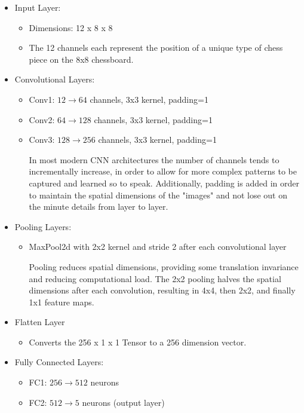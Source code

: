 \begin{itemize}
    \item Input Layer:
    \begin{itemize}
        \item Dimensions: 12 x 8 x 8
        \item The 12 channels each represent the position of a unique type of chess piece on the 8x8 chessboard.
    \end{itemize}
    \item Convolutional Layers:
    \begin{itemize}
        \item Conv1: $12 \rightarrow 64$ channels, 3x3 kernel, padding=1
        \item Conv2: $64 \rightarrow 128$ channels, 3x3 kernel, padding=1
        \item Conv3: $128 \rightarrow 256$ channels, 3x3 kernel, padding=1

        In most modern CNN architectures the number of channels tends to incrementally increase, in order to allow for more complex patterns to be captured and learned so to speak. Additionally, padding is added in order to maintain the spatial dimensions of the "images" and not lose out on the minute details from layer to layer.
    \end{itemize}

    \item Pooling Layers:
    \begin{itemize}
        \item MaxPool2d with 2x2 kernel and stride 2 after each convolutional layer
        
        Pooling reduces spatial dimensions, providing some translation invariance and reducing computational load. The 2x2 pooling halves the spatial dimensions after each convolution, resulting in 4x4, then 2x2, and finally 1x1 feature maps.
    \end{itemize}
    
    \item Flatten Layer
    \begin{itemize}
        \item Converts the 256 x 1 x 1 Tensor to a 256 dimension vector.
    \end{itemize}
    
    \item Fully Connected Layers:
    \begin{itemize}
        \item FC1: $256 \rightarrow 512$ neurons
        \item FC2: $512 \rightarrow 5$ neurons (output layer)
        

\end{itemize}
\end{itemize}
